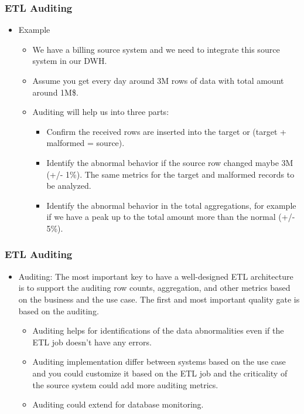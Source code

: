 \begin{frame}
	\frametitle{ETL Auditing}
	\begin{itemize}[<+->]
		\item Example
		\begin{itemize}[<+->]
			\item We have a billing source system and we need to integrate this source system in our DWH. 
			\item Assume you get every day around 3M rows of data with total amount around 1M\$.
			\item Auditing will help us into three parts:
			\begin{itemize}[<+->]
				\item Confirm the received rows are inserted into the target or (target + malformed = source).
				\item Identify the abnormal behavior if the source row changed maybe 3M (+/- 1\%). The same metrics for the target and malformed records to be analyzed.
				\item Identify the abnormal behavior in the total aggregations, for example if we have a peak up to the total amount more than the normal (+/- 5\%).								
			\end{itemize}					
		\end{itemize}
	\end{itemize}
\end{frame}


\begin{frame}
	\frametitle{ETL Auditing}
	\begin{itemize}[<+->]
		\item Auditing: The most important key to have a well-designed ETL architecture is to support the auditing row counts, aggregation, and other metrics based on the business and the use case. The first and most important quality gate is based on the auditing.
		
		\begin{itemize}[<+->]
			\item Auditing helps for identifications of the data abnormalities even if the ETL job doesn't have any errors.
			\item  Auditing implementation differ between systems based on the use case and you could customize it based on the ETL job and the criticality of the source system could add more auditing metrics.
			\item  Auditing could extend for database monitoring.
			
			
		\end{itemize}
	\end{itemize}
\end{frame}


